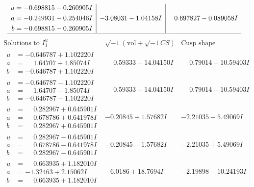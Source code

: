 \documentclass[1p]{elsarticle_modified}
\theoremstyle{definition}
\newcommand{\I}{\sqrt{-1}}
\begin{document}
$$\begin{array}{c|c|c}
\begin{aligned}
u &= -0.698815 - 0.260905 I \\
a &= -0.249931 - 0.254046 I \\
b &= -0.698815 - 0.260905 I\end{aligned}
 & -3.08031 - 1.04158 I & \phantom{-}0.697827 - 0.089058 I\\
 \hline 
 \end{array}$$\newpage$$\begin{array}{c|c|c}  
\text{Solutions to }I^u_{1}& \I (\text{vol} + \sqrt{-1}CS) & \text{Cusp shape}\\
 \hline 
\begin{aligned}
u &= -0.646787 + 1.102220 I \\
a &= \phantom{-}1.64707 + 1.85074 I \\
b &= -0.646787 + 1.102220 I\end{aligned}
 & \phantom{-}0.59333 - 14.04150 I & \phantom{-}0.79014 + 10.59403 I \\ \hline\begin{aligned}
u &= -0.646787 - 1.102220 I \\
a &= \phantom{-}1.64707 - 1.85074 I \\
b &= -0.646787 - 1.102220 I\end{aligned}
 & \phantom{-}0.59333 + 14.04150 I & \phantom{-}0.79014 - 10.59403 I \\ \hline\begin{aligned}
u &= \phantom{-}0.282967 + 0.645901 I \\
a &= \phantom{-}0.678786 + 0.641978 I \\
b &= \phantom{-}0.282967 + 0.645901 I\end{aligned}
 & -0.20845 + 1.57682 I & -2.21035 - 5.49069 I \\ \hline\begin{aligned}
u &= \phantom{-}0.282967 - 0.645901 I \\
a &= \phantom{-}0.678786 - 0.641978 I \\
b &= \phantom{-}0.282967 - 0.645901 I\end{aligned}
 & -0.20845 - 1.57682 I & -2.21035 + 5.49069 I \\ \hline\begin{aligned}
u &= \phantom{-}0.663935 + 1.182010 I \\
a &= -1.32463 + 2.15062 I \\
b &= \phantom{-}0.663935 + 1.182010 I\end{aligned}
 & -6.0186 + 18.7694 I & -2.19898 - 10.24193 I \\ \hline\begin{aligned}

\end{aligned}
\end{array}$$
\end{document}
